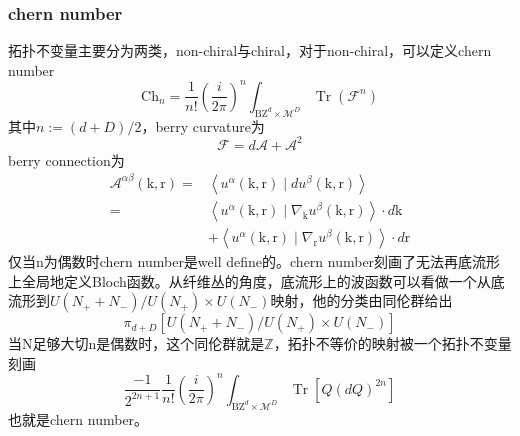 \documentclass[10pt,openany]{book}
\theoremstyle{thmstyle} %
\theoremstyle{defstyle} %
\theoremstyle{prostyle} %
\begin{document}
\subsubsection*{chern number}
拓扑不变量主要分为两类，non-chiral与chiral，对于non-chiral，可以定义chern number
\begin{equation}
  \mathrm{Ch}_n=\frac{1}{n!}\left(\frac{i}{2 \pi}\right)^n \int_{\mathrm{BZ}^d \times \mathcal{M}^D} \operatorname{Tr}\left(\mathcal{F}^n\right)
\end{equation}
其中$ n:=(d+D) / 2 $，berry curvature为
\begin{equation}
  \mathcal{F}=d \mathcal{A}+\mathcal{A}^2
\end{equation}
berry connection为
\begin{equation}
  \begin{aligned}
    \mathcal{A}^{\alpha \beta}(\mathrm{k}, \mathrm{r})= & \left\langle u^\alpha(\mathrm{k}, \mathrm{r}) \mid d u^\beta(\mathrm{k}, \mathrm{r})\right\rangle \\
    = & \left\langle u^\alpha(\mathrm{k}, \mathrm{r}) \mid \nabla_{\mathrm{k}} u^\beta(\mathrm{k}, \mathrm{r})\right\rangle \cdot d \mathrm{k} \\
    & +\left\langle u^\alpha(\mathrm{k}, \mathrm{r}) \mid \nabla_{\mathrm{r}} u^\beta(\mathrm{k}, \mathrm{r})\right\rangle \cdot d \mathrm{r}
    \end{aligned}
\end{equation}
仅当n为偶数时chern number是well define的。chern number刻画了无法再底流形上全局地定义Bloch函数。从纤维丛的角度，底流形上的波函数可以看做一个从底流形到$ U\left(N_{+}+N_{-}\right) / U\left(N_{+}\right) \times U\left(N_{-}\right) $映射，他的分类由同伦群给出
\begin{equation}
  \pi_{d+D}\left[U\left(N_{+}+N_{-}\right) / U\left(N_{+}\right) \times U\left(N_{-}\right)\right]
\end{equation}
当N足够大切n是偶数时，这个同伦群就是$ \mathbb{Z} $，拓扑不等价的映射被一个拓扑不变量刻画
\begin{equation}
  \frac{-1}{2^{2 n+1}} \frac{1}{n!}\left(\frac{i}{2 \pi}\right)^n \int_{\mathrm{BZ}^d \times \mathcal{M}^D} \operatorname{Tr}\left[Q(d Q)^{2 n}\right]
\end{equation}
也就是chern number。
\end{document}
